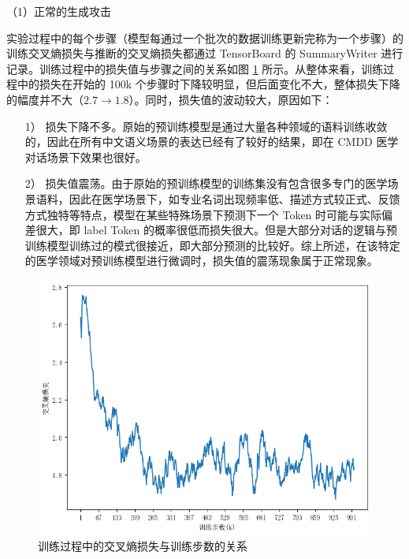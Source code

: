 （1）正常的生成攻击


实验过程中的每个步骤（模型每通过一个批次的数据训练更新完称为一个步骤）的训练交叉熵损失与推断的交叉熵损失都通过 TensorBoard 的 SummaryWriter\cite{tensorflow} 进行记录。训练过程中的损失值与步骤之间的关系如图 \ref{Chap3_train_loss} 所示。从整体来看，训练过程中的损失在开始的 100k 个步骤时下降较明显，但后面变化不大，整体损失下降的幅度并不大（$2.7\rightarrow 1.8$）。同时，损失值的波动较大，原因如下：

\begin{itemize}
	\item [1）]
	损失下降不多。原始的预训练模型是通过大量各种领域的语料训练收敛的，因此在所有中文语义场景的表达已经有了较好的结果，即在 CMDD 医学对话场景下效果也很好。
	\item [2）]
	损失值震荡。由于原始的预训练模型的训练集没有包含很多专门的医学场景语料，因此在医学场景下，如专业名词出现频率低、描述方式较正式、反馈方式独特等特点，模型在某些特殊场景下预测下一个 Token 时可能与实际偏差很大，即 label Token 的概率很低而损失很大。但是大部分对话的逻辑与预训练模型训练过的模式很接近，即大部分预测的比较好。综上所述，在该特定的医学领域对预训练模型进行微调时，损失值的震荡现象属于正常现象。
\end{itemize}

\begin{figure}[h]
	\centering
	\includegraphics[width=\linewidth]{figures/Chap3_train_loss.png}
	\caption{训练过程中的交叉熵损失与训练步数的关系}
	\label{Chap3_train_loss}
\end{figure}


